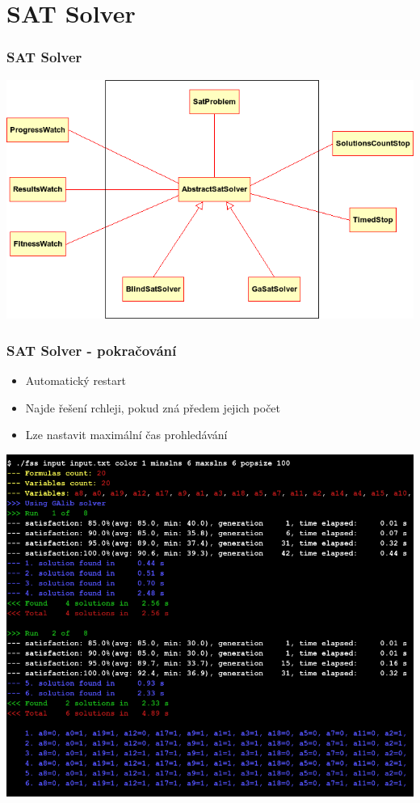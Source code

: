 \documentclass{beamer}
\begin{document}
\section{SAT Solver}
\begin{frame}
  \frametitle{SAT Solver}
  \includegraphics[scale=0.45]{AbstractSatSolver.png}
\end{frame}
\begin{frame}
  \frametitle{SAT Solver - pokračování}
  \begin{itemize}
   \item Automatický restart
   \medskip\item Najde řešení rchleji, pokud zná předem jejich počet
   \medskip\item Lze nastavit maximální čas prohledávání
  \end{itemize}
  \begin{flushright}
    \includegraphics[scale=0.2]{screenshot.png}
  \end{flushright}
\end{frame}
\end{document}
